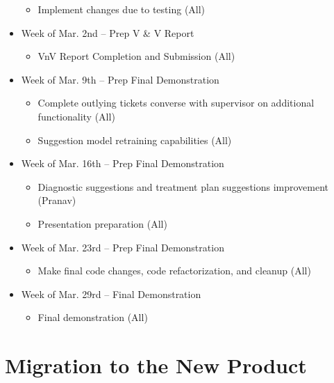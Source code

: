 \documentclass[12pt]{article}
\begin{document}
\begin{itemize}
\begin{itemize}
      \item Implement changes due to testing (All)
    \end{itemize}
  \item Week of Mar. 2nd -- Prep V \& V Report
    \begin{itemize}
      \item VnV Report Completion and Submission (All)
    \end{itemize}
  \item Week of Mar. 9th -- Prep Final Demonstration
    \begin{itemize}
      \item Complete outlying tickets converse with supervisor on additional functionality (All)
      \item Suggestion model retraining capabilities (All)
    \end{itemize}
  \item Week of Mar. 16th -- Prep Final Demonstration
    \begin{itemize}
      \item Diagnostic suggestions and treatment plan suggestions improvement (Pranav)
      \item Presentation preparation (All)
    \end{itemize}
  \item Week of Mar. 23rd -- Prep Final Demonstration
    \begin{itemize}
      \item Make final code changes, code refactorization, and cleanup (All)
    \end{itemize}
  \item Week of Mar. 29rd -- Final Demonstration
    \begin{itemize}
      \item Final demonstration (All)
    \end{itemize}

\end{itemize}  

\section{Migration to the New Product}
\end{document}
